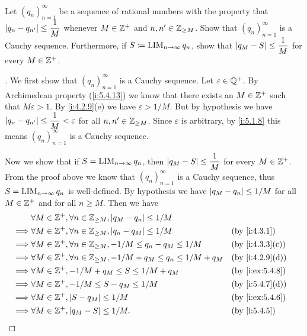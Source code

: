 \begin{ex}\label{i:ex:5.5.4}
  Let \((q_n)_{n = 1}^\infty\) be a sequence of rational numbers with the property that \(\left\lvert q_n - q_{n'}\right\rvert \leq \dfrac{1}{M}\) whenever \(M \in \mathbb{Z}^+\) and \(n, n' \in \mathbb{Z}_{\geq M}\).
  Show that \((q_n)_{n = 1}^\infty\) is a Cauchy sequence.
  Furthermore, if \(S \coloneqq \operatorname*{LIM}_{n \to \infty} q_n\), show that \(\left\lvert q_M - S\right\rvert \leq \dfrac{1}{M}\) for every \(M \in \mathbb{Z}^+\).
\end{ex}

\begin{proof}[]
  We first show that \((q_n)_{n = 1}^\infty\) is a Cauchy sequence.
  Let \(\varepsilon \in \mathbb{Q}^+\).
  By Archimedean property (\cref{i:5.4.13}) we know that there exists an \(M \in \mathbb{Z}^+\) such that \(M \varepsilon > 1\).
  By \cref{i:4.2.9}(e) we have \(\varepsilon > 1 / M\).
  But by hypothesis we have \(\left\lvert q_n - q_{n'}\right\rvert \leq \dfrac{1}{M} < \varepsilon\) for all \(n, n' \in \mathbb{Z}_{\geq M}\).
  Since \(\varepsilon\) is arbitrary, by \cref{i:5.1.8} this means \((q_n)_{n = 1}^{\infty}\) is a Cauchy sequence.

  Now we show that if \(S = \operatorname*{LIM}_{n \to \infty} q_n\), then \(\left\lvert q_M - S\right\rvert \leq \dfrac{1}{M}\) for every \(M \in \mathbb{Z}^+\).
  From the proof above we know that \((q_n)_{n = 1}^\infty\) is a Cauchy sequence, thus \(S = \operatorname*{LIM}_{n \to \infty} q_n\) is well-defined.
  By hypothesis we have \(\left\lvert q_M - q_n\right\rvert \leq 1 / M\) for all \(M \in \mathbb{Z}^+\) and for all \(n \geq M\).
  Then we have
  \begin{align*}
             & \forall M \in \Z^+, \forall n \in \Z_{\geq M}, \abs{q_M - q_n} \leq 1 / M                                  \\
    \implies & \forall M \in \Z^+, \forall n \in \Z_{\geq M}, \abs{q_n - q_M} \leq 1 / M             &  & \by{i:4.3.1}    \\
    \implies & \forall M \in \Z^+, \forall n \in \Z_{\geq M}, -1 / M \leq q_n - q_M \leq 1 / M       &  & \by{i:4.3.3}[c] \\
    \implies & \forall M \in \Z^+, \forall n \in \Z_{\geq M}, -1 / M + q_M \leq q_n \leq 1 / M + q_M &  & \by{i:4.2.9}[d] \\
    \implies & \forall M \in \Z^+, -1 / M + q_M \leq S \leq 1 / M + q_M                              &  & \by{i:ex:5.4.8} \\
    \implies & \forall M \in \Z^+, -1 / M \leq S - q_M \leq 1 / M                                    &  & \by{i:5.4.7}[d] \\
    \implies & \forall M \in \Z^+, \abs{S - q_M} \leq 1 / M                                          &  & \by{i:ex:5.4.6} \\
    \implies & \forall M \in \Z^+, \abs{q_M - S} \leq 1 / M.                                         &  & \by{i:5.4.5}
  \end{align*}
\end{proof}

